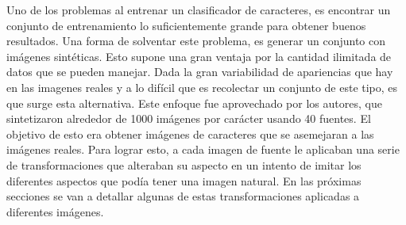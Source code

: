 	Uno de los problemas al entrenar un clasificador de caracteres, es encontrar un conjunto de entrenamiento lo suficientemente grande para obtener buenos resultados. Una forma de solventar este problema, es generar un conjunto con imágenes sintéticas. Esto supone una gran ventaja por la cantidad ilimitada de datos que se pueden manejar. Dada la gran variabilidad de apariencias que hay en las imagenes reales y a lo difícil que es recolectar un conjunto de este tipo, es que surge esta alternativa. Este enfoque fue aprovechado por los autores, que sintetizaron alrededor de 1000 imágenes por carácter usando 40 fuentes. El objetivo de esto era obtener imágenes de caracteres que se asemejaran a las imágenes reales. Para lograr esto, a cada imagen de fuente le aplicaban una serie de transformaciones que alteraban su aspecto en un intento de imitar los diferentes aspectos que podía tener una imagen natural. En las próximas secciones se van a detallar algunas de estas transformaciones aplicadas a diferentes imágenes.
	


